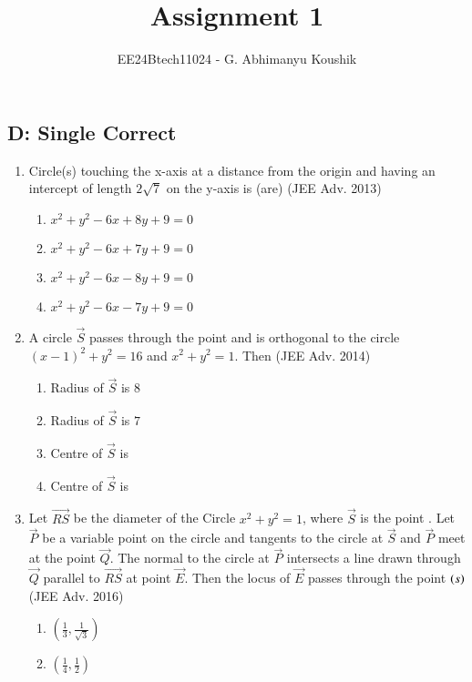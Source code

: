 \documentclass[journal,12pt,twocolumn]{IEEEtran}
\theoremstyle{remark}
\begin{document}
\title{Assignment 1}
\author{EE24Btech11024 - G. Abhimanyu Koushik}
\maketitle
\renewcommand{\thefigure}{\theenumi}
\renewcommand{\thetable}{\theenumi}
\subsection*{D: Single Correct}
\begin{enumerate}
\item Circle(s) touching the x-axis at a distance  from the origin and having an intercept of length $2\sqrt{7}$ on the y-axis is (are)
\hfill {(JEE Adv. 2013)}
\begin{enumerate}[label=(\alph*)]
\item $x^2 + y^2 - 6x + 8y + 9 = 0$
\item $x^2 + y^2 - 6x + 7y + 9 = 0$
\item $x^2 + y^2 - 6x - 8y + 9 = 0$
\item $x^2 + y^2 - 6x - 7y + 9 = 0$
\end{enumerate}
\item A circle $\vec{S}$ passes through the point  and is orthogonal to the circle $(x-1)^2+y^2=16$ and $x^2+y^2=1$. Then
\hfill{(JEE Adv. 2014)}
\begin{enumerate}[label=(\alph*)]
\item Radius of $\vec{S}$ is $8$
\item Radius of $\vec{S}$ is $7$
\item Centre of $\vec{S}$ is 
\item Centre of $\vec{S}$ is 
\end{enumerate}
\item Let $\vec{RS}$ be the diameter of the Circle $x^{2} + y^{2} = 1$, where $\vec{S}$ is the point . Let $\vec{P}$ be a variable point  on the circle and tangents to the circle at $\vec{S}$ and $\vec{P}$ meet at the point $\vec{Q}$. The normal to the circle at $\vec{P}$ intersects a line drawn through $\vec{Q}$ parallel to $\vec{RS}$ at point $\vec{E}$. Then the locus of $\vec{E}$ passes through the point $\left(s\right)$
\hfill{(JEE Adv. 2016)}
\begin{enumerate}[label=(\alph*)]
\item $\left(\frac{1}{3}, \frac{1}{\sqrt{3}}\right)$
\item $\left(\frac{1}{4}, \frac{1}{2} \right)$

\end{enumerate}
\end{enumerate}
\end{document}
